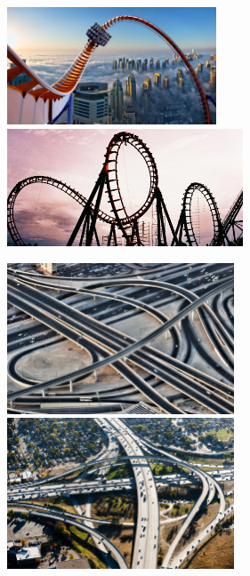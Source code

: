 \begin{center}
	\includegraphics[height=3.5cm]{./images/ch3/RC-1.jpg}\quad
	\includegraphics[height=3.5cm]{./images/ch3/RC-2.jpg}
	
	\bigskip
	
	
	\includegraphics[height=4.5cm]{./images/ch3/HW-1.jpg}\quad
	\includegraphics[height=4.5cm]{./images/ch3/HW-2.jpg}
	
\end{center}

